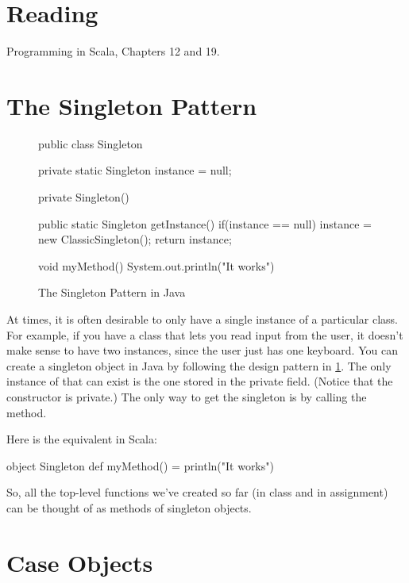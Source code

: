 \documentclass{book}
\begin{document}
\section{Reading}

Programming in Scala, Chapters 12 and 19.

\section{The Singleton Pattern}

\begin{figure}
\begin{javacode}
public class Singleton {
  private static Singleton instance = null;

  private Singleton() { }

  public static Singleton getInstance() {
    if(instance == null) {
      instance = new ClassicSingleton();
    }
    return instance;
  }

  void myMethod() {
    System.out.println("It works")
  }

}
\end{javacode}
\caption{The Singleton Pattern in Java}
\label{javasingleton}
\end{figure}

At times, it is often desirable to only have a single instance of a particular
class. For example, if you have a class that lets you read input from the
user, it doesn't make sense to have two instances, since the user just has
one keyboard. You can create a singleton object in Java by following the
design pattern in \cref{javasingleton}. The only instance of 
that can exist is the one stored in the private field. (Notice that the constructor
is private.) The only way to get
the singleton is by calling the  method.

Here is the equivalent in Scala:

\begin{scalacode}
object Singleton {
  def myMethod() = println("It works")
}
\end{scalacode}

So, all the top-level functions we've created so far (in class and in
assignment) can be thought of as methods of singleton objects.

\section{Case Objects}
\end{document}

